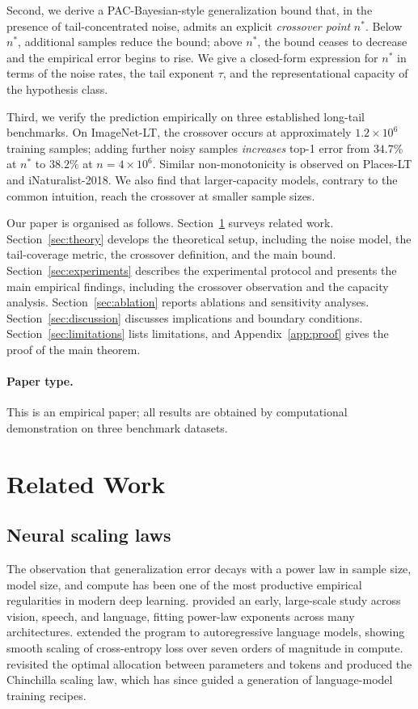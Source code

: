 \documentclass[11pt]{article}
\begin{document}
Second, we derive a PAC-Bayesian-style generalization bound that, in the presence of tail-concentrated noise, admits an explicit \emph{crossover point} $n^{*}$. Below $n^{*}$, additional samples reduce the bound; above $n^{*}$, the bound ceases to decrease and the empirical error begins to rise. We give a closed-form expression for $n^{*}$ in terms of the noise rates, the tail exponent $\tau$, and the representational capacity of the hypothesis class.

Third, we verify the prediction empirically on three established long-tail benchmarks. On ImageNet-LT, the crossover occurs at approximately $1.2 \times 10^6$ training samples; adding further noisy samples \emph{increases} top-1 error from $34.7\%$ at $n^{*}$ to $38.2\%$ at $n = 4 \times 10^6$. Similar non-monotonicity is observed on Places-LT and iNaturalist-2018. We also find that larger-capacity models, contrary to the common intuition, reach the crossover at smaller sample sizes.

Our paper is organised as follows. Section~\ref{sec:related} surveys related work. Section~\ref{sec:theory} develops the theoretical setup, including the noise model, the tail-coverage metric, the crossover definition, and the main bound. Section~\ref{sec:experiments} describes the experimental protocol and presents the main empirical findings, including the crossover observation and the capacity analysis. Section~\ref{sec:ablation} reports ablations and sensitivity analyses. Section~\ref{sec:discussion} discusses implications and boundary conditions. Section~\ref{sec:limitations} lists limitations, and Appendix~\ref{app:proof} gives the proof of the main theorem.

\paragraph{Paper type.} This is an empirical paper; all results are obtained by computational demonstration on three benchmark datasets.

\section{Related Work} \label{sec:related}

\subsection{Neural scaling laws}

The observation that generalization error decays with a power law in sample size, model size, and compute has been one of the most productive empirical regularities in modern deep learning. \citet{hestness2017} provided an early, large-scale study across vision, speech, and language, fitting power-law exponents across many architectures. \citet{kaplan2020} extended the program to autoregressive language models, showing smooth scaling of cross-entropy loss over seven orders of magnitude in compute. \citet{hoffmann2022} revisited the optimal allocation between parameters and tokens and produced the Chinchilla scaling law, which has since guided a generation of language-model training recipes.
\end{document}
